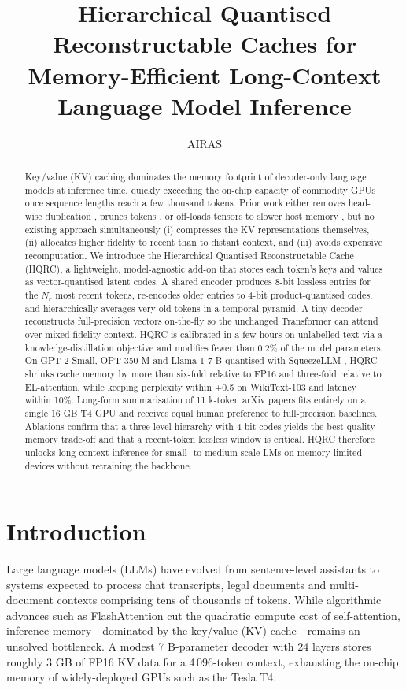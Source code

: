 \documentclass{article}
\title{Hierarchical Quantised Reconstructable Caches for Memory-Efficient Long-Context Language Model Inference}
\author{AIRAS}
\begin{document}
\maketitle

\begin{abstract}
Key/value (KV) caching dominates the memory footprint of decoder-only language models at inference time, quickly exceeding the on-chip capacity of commodity GPUs once sequence lengths reach a few thousand tokens. Prior work either removes head-wise duplication \cite{yan-2021-attention}, prunes tokens \cite{anagnostidis-2023-dynamic}, or off-loads tensors to slower host memory \cite{sheng-2023-flexgen}, but no existing approach simultaneously (i) compresses the KV representations themselves, (ii) allocates higher fidelity to recent than to distant context, and (iii) avoids expensive recomputation. We introduce the Hierarchical Quantised Reconstructable Cache (HQRC), a lightweight, model-agnostic add-on that stores each token’s keys and values as vector-quantised latent codes. A shared encoder produces 8-bit lossless entries for the \(N_r\) most recent tokens, re-encodes older entries to 4-bit product-quantised codes, and hierarchically averages very old tokens in a temporal pyramid. A tiny decoder reconstructs full-precision vectors on-the-fly so the unchanged Transformer can attend over mixed-fidelity context. HQRC is calibrated in a few hours on unlabelled text via a knowledge-distillation objective and modifies fewer than 0.2\% of the model parameters. On GPT-2-Small, OPT-350 M and Llama-1-7 B quantised with SqueezeLLM \cite{kim-2023-squeezellm}, HQRC shrinks cache memory by more than six-fold relative to FP16 and three-fold relative to EL-attention, while keeping perplexity within +0.5 on WikiText-103 and latency within 10\%. Long-form summarisation of 11 k-token arXiv papers fits entirely on a single 16 GB T4 GPU and receives equal human preference to full-precision baselines. Ablations confirm that a three-level hierarchy with 4-bit codes yields the best quality-memory trade-off and that a recent-token lossless window is critical. HQRC therefore unlocks long-context inference for small- to medium-scale LMs on memory-limited devices without retraining the backbone.
\end{abstract}

\section{Introduction}
Large language models (LLMs) have evolved from sentence-level assistants to systems expected to process chat transcripts, legal documents and multi-document contexts comprising tens of thousands of tokens. While algorithmic advances such as FlashAttention cut the quadratic compute cost of self-attention, inference memory - dominated by the key/value (KV) cache - remains an unsolved bottleneck. A modest 7 B-parameter decoder with 24 layers stores roughly 3 GB of FP16 KV data for a 4\,096-token context, exhausting the on-chip memory of widely-deployed GPUs such as the Tesla T4.
\end{document}
